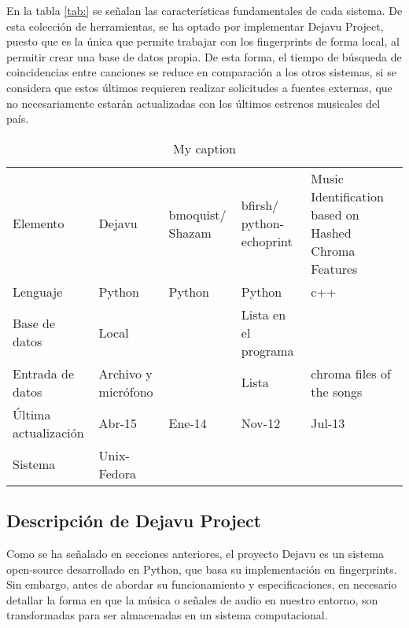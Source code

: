 En la tabla \ref{tab:} se señalan las características fundamentales de cada sistema. De esta colección de herramientas, se ha optado por implementar Dejavu Project, puesto que es la única que permite trabajar con los fingerprints de forma local, al permitir crear una base de datos propia. De esta forma, el tiempo de búsqueda de coincidencias entre canciones se reduce en comparación a los otros sistemas, si se considera que estos últimos requieren realizar solicitudes a fuentes externas, que no necesariamente estarán actualizadas con los últimos estrenos musicales del país.

\begin{table}[]
\centering
\caption{My caption}
\label{my-label}
\begin{tabular}{lllll}
Elemento             & Dejavu              & bmoquist/ Shazam & bfirsh/ python-echoprint & Music Identification based on Hashed Chroma Features \\
Lenguaje             & Python              & Python           & Python                   & c++                                                  \\
Base de datos        & Local               &                  & Lista en el programa     &                                                      \\
Entrada de datos     & Archivo y micrófono &                  & Lista                    & chroma files of the songs                            \\
Última actualización & Abr-15              & Ene-14           & Nov-12                   & Jul-13                                               \\
Sistema              & Unix-Fedora         &                  &                          &                                                     
\end{tabular}
\end{table}



\subsection{Descripción de Dejavu Project}


Como se ha señalado en secciones anteriores, el proyecto Dejavu es un sistema open-source desarrollado en Python, que basa su implementación en fingerprints. Sin embargo, antes de abordar su funcionamiento y especificaciones, en necesario detallar la forma en que la música o señales de audio en nuestro entorno, son transformadas para ser almacenadas en un sistema computacional.

